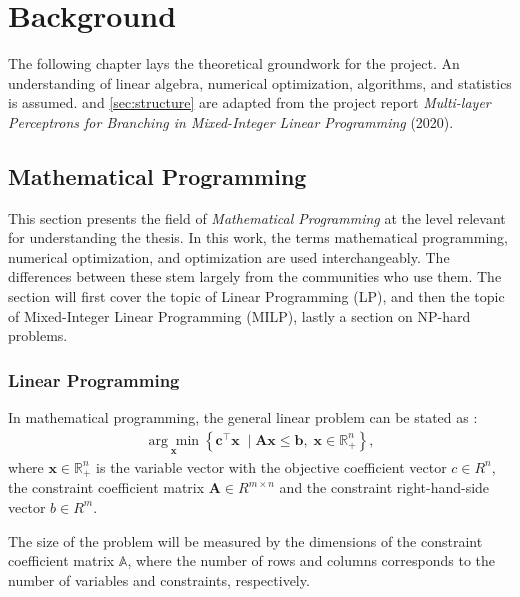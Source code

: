 \chapter{Background}\label{cha:background}

The following chapter lays the theoretical groundwork for the project. An understanding of linear algebra, numerical optimization, algorithms, and statistics is assumed.  and \ref{sec:structure} are adapted from the project report \textit{Multi-layer Perceptrons for Branching in Mixed-Integer Linear Programming} (2020). 


\section{Mathematical Programming}\label{sec:mathprog}

This section presents the field of \textit{Mathematical Programming} at the level relevant for understanding the thesis.
In this work, the terms mathematical programming, numerical optimization, and optimization are used interchangeably. The differences between these stem largely from the communities who use them. The section will first cover the topic of Linear Programming (\gls{LP}), and then the topic of Mixed-Integer Linear Programming (\gls{MILP}), lastly a section on NP-hard problems.  


\subsection{Linear Programming}

In mathematical programming, the general linear problem can be stated as \cite{gasse2019exact}:
\begin{align} \label{eq:lp}
    \underset{\mathbf{x}}{\arg \min }\left\{\mathbf{c}^{\top} \mathbf{x} \; \mid \mathbf{A} \mathbf{x} \leq \mathbf{b},\; \mathbf{x} \in \mathbb{R}_+^{n}\right\},
\end{align}
where $ \mathbf{x} \in \mathbb{R}_+^n$ is the variable vector
with the objective coefficient vector $c \in R^n $, 
the constraint coefficient matrix $\mathbf{A} \in R^{m \times n}$
and the constraint right-hand-side vector $b \in R^m $.

The size of the problem will be measured by the dimensions of the constraint coefficient matrix $ \mathbb{A} $, where the number of rows and columns corresponds to the number of variables and constraints, respectively.

